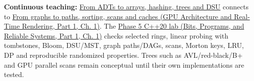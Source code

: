 \textbf{Continuous teaching:} \hyperref[01-foundations-i-ch007-the-scene-is-now-too-large-for-the-wrong-container-phase-5-m025m027-parts-401445]{From ADTs to arrays, hashing, trees and DSU} connects to \href{../06-GPU-Architecture-and-Real-Time-Rendering-P01/main.pdf\#01-foundations-i-ch008-from-an-asset-map-to-a-correct-navigable-world-phase-5-m028m030-parts-446500}{From graphs to paths, sorting, scans and caches (GPU Architecture and Real-Time Rendering, Part 1, Ch. 1)}. The \href{../01-Bits-Programs-and-Reliable-Systems-P01/main.pdf\#source-file-0ec69e1a1a11439bca29faa5}{Phase 5 C++20 lab (Bits, Programs, and Reliable Systems, Part 1, Ch. 1)} checks selected rings, linear probing with tombstones, Bloom, DSU/MST, graph paths/DAGs, scans, Morton keys, LRU, DP and reproducible randomized properties. Trees such as AVL/red-black/B+ and GPU parallel scans remain conceptual until their own implementations are tested.

